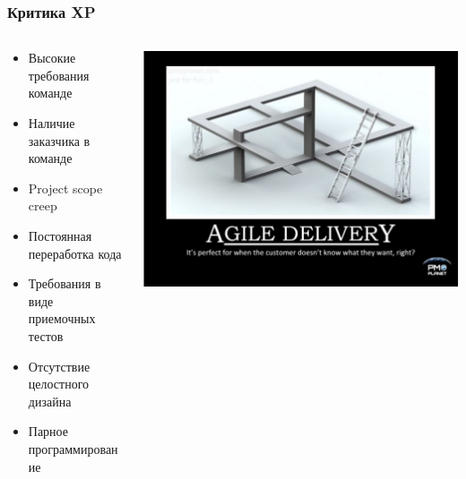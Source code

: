 \documentclass{../../slides-style}
\begin{document}
    \begin{frame}
        \frametitle{Критика XP}
        \begin{columns}
            \begin{column}{0.7\textwidth}
                \begin{itemize}
                    \item Высокие требования команде
                    \item Наличие заказчика в команде
                    \item Project scope creep
                    \item Постоянная переработка кода
                    \item Требования в виде приемочных тестов
                    \item Отсутствие целостного дизайна
                    \item Парное программирование
                \end{itemize}
            \end{column}
            \begin{column}{0.3\textwidth}
                \begin{center}
                    \includegraphics[width=\textwidth]{agileDelivery.png}
                \end{center}
            \end{column}
        \end{columns}
    \end{frame}
\end{document}
